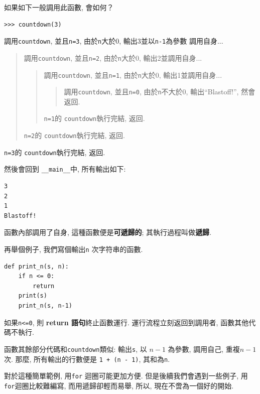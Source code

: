 \documentclass[10pt]{book}
\begin{document}
如果如下一般調用此函數, 會如何？

\begin{verbatim}
>>> countdown(3)
\end{verbatim}
%

調用{\tt countdown}, 並且{\tt n=3}, 由於{\tt n}大於0, 輸出3並以{\tt n-1}為參數
調用自身...

\begin{quote}
調用{\tt countdown},  並且{\tt n=2}, 由於{\tt n}大於0, 輸出2並調用自身...

\begin{quote}
調用{\tt countdown},  並且{\tt n=1}, 由於{\tt n}大於0, 輸出1並調用自身...

\begin{quote}
調用{\tt countdown},  並且{\tt n=0}, 由於{\tt n}不大於0, 輸出``Blastoff!'', 
然會返回. 
\end{quote}

{\tt n=1}的 {\tt countdown}執行完結, 返回. 
\end{quote}

{\tt n=2}的 {\tt countdown}執行完結, 返回. 
\end{quote}

{\tt n=3}的 {\tt countdown}執行完結, 返回. 

然後會回到 \verb"__main__"中,  所有輸出如下:

\begin{verbatim}
3
2
1
Blastoff!
\end{verbatim}
%
函數內部調用了自身, 這種函數便是{\bf 可遞歸的};
其執行過程叫做{\bf 遞歸}.

再舉個例子, 我們寫個輸出{\tt n} 次字符串的函數.

\begin{verbatim}
def print_n(s, n):
    if n <= 0:
        return
    print(s)
    print_n(s, n-1)
\end{verbatim}
%
如果{\tt n<=0}, 則 {\bf return 語句}終止函數運行. 
運行流程立刻返回到調用者, 函數其他代碼不執行. 

函數其餘部分代碼和{\tt countdown}類似: 
輸出{\tt s},  以 $n-1$ 為參數, 調用自己, 重複$n-1$次. 
那麼, 所有輸出的行數便是 {\tt 1 + (n - 1)},  其和為{\tt n}. 

對於這種簡單範例, 用{\tt for} 迴圈可能更加方便. 
但是後續我們會遇到一些例子, 用{\tt for}迴圈比較難編寫, 而用遞歸卻輕而易舉, 
所以, 現在不啻為一個好的開始. 
\end{document}
